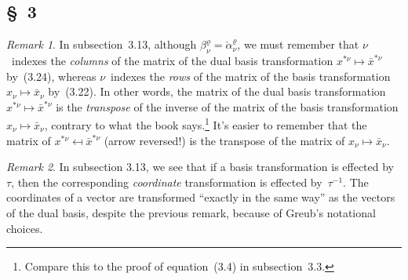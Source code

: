 \documentclass[letterpaper,12pt]{article}
\theoremstyle{definition}
\theoremstyle{remark}
\newtheorem*{rmk}{Remark}
\begin{document}
\subsection*{\S~3}
\begin{rmk}
In subsection~3.13, although \(\beta^{\varrho}_{\nu}=\check{\alpha}_{\nu}^{\varrho}\), we must remember that \(\nu\)~indexes the \emph{columns} of the matrix of the dual basis transformation \(x^{*\nu}\mapsto\bar{x}^{*\nu}\) by~(3.24), whereas \(\nu\)~indexes the \emph{rows} of the matrix of the basis transformation \(x_{\nu}\mapsto\bar{x}_{\nu}\) by~(3.22). In other words, the matrix of the dual basis transformation \(x^{*\nu}\mapsto\bar{x}^{*\nu}\) is the \emph{transpose} of the inverse of the matrix of the basis transformation \(x_{\nu}\mapsto\bar{x}_{\nu}\), contrary to what the book says.\footnote{Compare this to the proof of equation~(3.4) in subsection~3.3.} It's easier to remember that the matrix of \(x^{*\nu}\mapsfrom\bar{x}^{*\nu}\) (arrow reversed!) is the transpose of the matrix of \(x_{\nu}\mapsto\bar{x}_{\nu}\).
\end{rmk}

\begin{rmk}
In subsection 3.13, we see that if a basis transformation is effected by~\(\tau\), then the corresponding \emph{coordinate} transformation is effected by~\(\tau^{-1}\). The coordinates of a vector are transformed ``exactly in the same way'' as the vectors of the dual basis, despite the previous remark, because of Greub's notational choices.
\end{rmk}

\newpage
\end{document}
